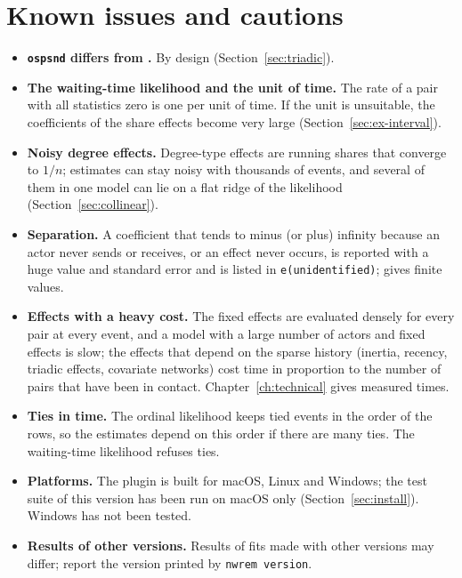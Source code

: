 \section{Known issues and cautions}

\begin{itemize}
  \item \textbf{\texttt{ospsnd} differs from \relevent{}.} By design (Section~\ref{sec:triadic}).
  \item \textbf{The waiting-time likelihood and the unit of time.} The rate of a pair with all statistics zero is one per unit of time. If the unit is unsuitable, the coefficients of the share effects become very large (Section~\ref{sec:ex-interval}).
  \item \textbf{Noisy degree effects.} Degree-type effects are running shares that converge to $1/n$; estimates can stay noisy with thousands of events, and several of them in one model can lie on a flat ridge of the likelihood (Section~\ref{sec:collinear}).
  \item \textbf{Separation.} A coefficient that tends to minus (or plus) infinity because an actor never sends or receives, or an effect never occurs, is reported with a huge value and standard error and is listed in \texttt{e(unidentified)};  gives finite values.
  \item \textbf{Effects with a heavy cost.} The fixed effects are evaluated densely for every pair at every event, and a model with a large number of actors and fixed effects is slow; the effects that depend on the sparse history (inertia, recency, triadic effects, covariate networks) cost time in proportion to the number of pairs that have been in contact. Chapter~\ref{ch:technical} gives measured times.
  \item \textbf{Ties in time.} The ordinal likelihood keeps tied events in the order of the rows, so the estimates depend on this order if there are many ties. The waiting-time likelihood refuses ties.
  \item \textbf{Platforms.} The plugin is built for macOS, Linux and Windows; the test suite of this version has been run on macOS only (Section~\ref{sec:install}). Windows has not been tested. %
  \item \textbf{Results of other versions.} Results of fits made with other versions may differ; report the version printed by \texttt{nwrem version}.
\end{itemize}

